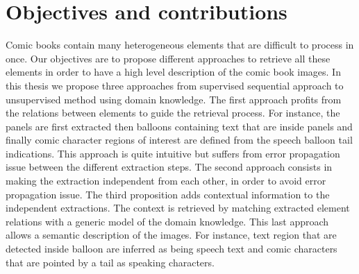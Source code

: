 \section{Objectives and contributions}
\label{sec:intro:objectives_contributions}
Comic books contain many heterogeneous elements that are difficult to process in once.
Our objectives are to propose different approaches to retrieve all these elements in order to have a high level description of the comic book images.
In this thesis we propose three approaches from supervised sequential approach to unsupervised method using domain knowledge. 
The first approach profits from the relations between elements to guide the retrieval process.
For instance, the panels are first extracted then balloons containing text that are inside panels and finally comic character regions of interest are defined from the speech balloon tail indications.
This approach is quite intuitive but suffers from error propagation issue between the different extraction steps.
The second approach consists in making the extraction independent from each other, in order to avoid error propagation issue.
The third proposition adds contextual information to the independent extractions.
The context is retrieved by matching extracted element relations with a generic model of the domain knowledge.
This last approach allows a semantic description of the images.
For instance, text region that are detected inside balloon are inferred as being speech text and comic characters that are pointed by a tail as speaking characters.

